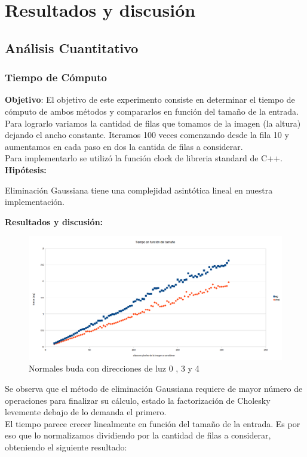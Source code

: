 \section{Resultados y discusión}

\subsection{Análisis Cuantitativo}
\subsubsection{Tiempo de Cómputo}
\textbf{Objetivo}:
El objetivo de este experimento consiste en determinar el tiempo de cómputo de ambos métodos y compararlos en función del tamaño de la entrada. Para lograrlo variamos la cantidad de filas que tomamos de la imagen (la altura) dejando el ancho constante. Iteramos 100 veces comenzando desde la fila 10 y aumentamos en cada paso en dos la cantida de filas a considerar.\\
Para implementarlo se utilizó la función clock de libreria standard de C++.\\

\textbf{Hipótesis:}

Eliminación Gaussiana tiene una complejidad asintótica lineal en nuestra implementación.

\textbf{Resultados y discusión:}

\begin{figure}[H]	
	\centering
	\includegraphics[width=1\linewidth]{img/tiempos.png}
	\caption{Normales buda con direcciones de luz 0 , 3 y 4}
    \label{fig:resultado}
\end{figure}

Se observa que el método de eliminación Gaussiana requiere de mayor número de operaciones para finalizar su cálculo, estado la factorización de Cholesky levemente debajo de lo demanda el primero. \\
El tiempo parece crecer linealmente en función del tamaño de la entrada. Es por eso que lo normalizamos dividiendo por la cantidad de filas a considerar, obteniendo el siguiente resultado:

